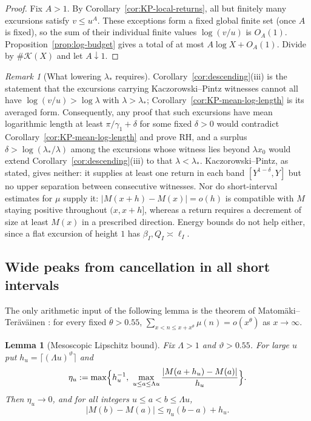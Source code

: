 \documentclass[11pt]{amsart}
\numberwithin{equation}{section}
\theoremstyle{plain}
\newtheorem{lemma}[theorem]{Lemma}
\theoremstyle{definition}
\theoremstyle{remark}
\newtheorem{remark}[theorem]{Remark}
\begin{document}
\begin{proof}
Fix $A>1$. By Corollary~\ref{cor:KP-local-returns}, all but finitely many excursions satisfy $v\le u^A$.  These exceptions
form a fixed global finite set (once $A$ is fixed), so the sum of their
individual finite values $\log(v/u)$ is $O_A(1)$.
Proposition~\ref{prop:log-budget} gives a total of at most
$A\log X+O_A(1)$. Divide by $\#\mathcal K(X)$ and let $A\downarrow1$.
\end{proof}

\begin{remark}[What lowering $\lambda_*$ requires]
\label{rem:surplus}
Corollary~\ref{cor:descending}(iii) is the statement that the
excursions carrying Kaczorowski--Pintz witnesses cannot all have
$\log(v/u)>\log\lambda$ with $\lambda>\lambda_*$;
Corollary~\ref{cor:KP-mean-log-length} is its averaged form. Consequently,
any proof that such excursions have mean logarithmic length at least
$\pi/\gamma_1+\delta$ for some fixed $\delta>0$ would contradict
Corollary~\ref{cor:KP-mean-log-length} and prove RH, and a surplus
$\delta>\log(\lambda_*/\lambda)$ among the excursions whose witness lies
beyond $\lambda x_0$ would extend Corollary~\ref{cor:descending}(iii) to
that $\lambda<\lambda_*$. Kaczorowski--Pintz, as stated, gives neither: it
supplies at least one return in each band $[Y^{1-\delta},Y]$ but no upper
separation between consecutive witnesses. Nor do short-interval estimates
for $\mu$ supply it: $|M(x+h)-M(x)|=o(h)$ is compatible with $M$ staying
positive throughout $(x,x+h]$, whereas a return requires a decrement of
size at least $M(x)$ in a prescribed direction. Energy bounds do not help
either, since a flat excursion of height $1$ has $\beta_I,Q_I\asymp\ell_I$.
\end{remark}

\subsection*{Wide peaks from cancellation in all short intervals}

The only arithmetic input of the following lemma is the theorem of
Matom\"aki--Ter\"av\"ainen \cite{MatomakiTeravainen2023}: for every fixed
$\theta>0.55$, $\sum_{x<n\le x+x^\theta}\mu(n)=o(x^\theta)$ as $x\to\infty$.

\begin{lemma}[Mesoscopic Lipschitz bound]
\label{lem:meso-lipschitz}
Fix $\Lambda>1$ and $\vartheta>0.55$. For large $u$ put
$h_u=\lceil(\Lambda u)^\vartheta\rceil$ and
\[
\eta_u:=\max\Bigl\{h_u^{-1},\ \max_{u\le a\le\Lambda u}
\frac{|M(a+h_u)-M(a)|}{h_u}\Bigr\}.
\]
Then $\eta_u\to0$, and for all integers $u\le a<b\le\Lambda u$,
\begin{equation}
\label{eq:meso-lipschitz}
|M(b)-M(a)|\le\eta_u(b-a)+h_u .
\end{equation}
\end{lemma}
\end{document}
